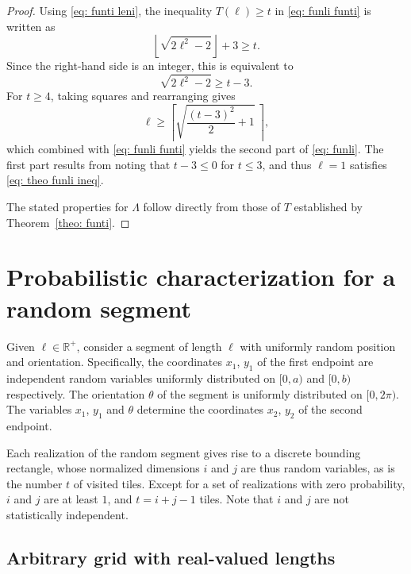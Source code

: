 \documentclass[12pt, a4paper]{article}
\newcommand{\funti}{T} %
\newcommand{\funli}{\Lambda} %
\newcommand{\len}{\ell} %
\newcommand{\leni}{\ell} %
\newcommand{\tiles}{t} %
\begin{document}
\begin{proof}
Using \eqref{eq: funti leni}, the inequality $\funti(\leni) \geq \tiles$ in \eqref{eq: funli funti} is written as
\begin{equation}
\left\lfloor \sqrt{2\leni^2-2} \right\rfloor + 3 \geq \tiles.
\end{equation}
Since the right-hand side is an integer, this is equivalent to
\begin{equation}
\label{eq: theo funli ineq}
\sqrt{2\leni^2-2} \geq \tiles-3.
\end{equation}
For $\tiles \geq 4$, taking squares and rearranging gives
\begin{equation}
\leni \geq \left \lceil \sqrt{\frac{(\tiles-3)^2} 2 + 1} \ \right \rceil,
\end{equation}
which combined with \eqref{eq: funli funti} yields the second part of \eqref{eq: funli}. The first part results from noting that $\tiles-3 \leq 0$ for $\tiles \leq 3$, and thus $\leni=1$ satisfies \eqref{eq: theo funli ineq}.

The stated properties for $\funli$ follow directly from those of $\funti$ established by Theorem~\ref{theo: funti}.
\end{proof}


\section{Probabilistic characterization for a random segment}
\label{part: rand}

Given $\len \in \mathbb R^+$, consider a segment of length $\len$ with uniformly random position and orientation. Specifically, the coordinates $x_1$, $y_1$ of the first endpoint are independent random variables uniformly distributed on $[0,a)$ and $[0,b)$ respectively. The orientation $\theta$ of the segment is uniformly distributed on $[0,2\pi)$. The variables $x_1$, $y_1$ and $\theta$ determine the coordinates $x_2$, $y_2$ of the second endpoint.

Each realization of the random segment gives rise to a discrete bounding rectangle, whose normalized dimensions $i$ and $j$ are thus random variables, as is the number $\tiles$ of visited tiles. Except for a set of realizations with zero probability, $i$ and $j$ are at least $1$, and $\tiles = i+j-1$ tiles. Note that $i$ and $j$ are not statistically independent. 


\subsection{Arbitrary grid with real-valued lengths}
\label{part: probmax: arbitrary grid, real lengths}
\end{document}
